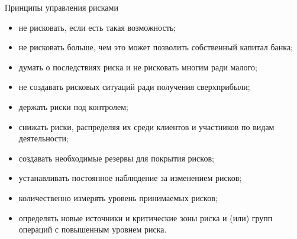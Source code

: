 \documentclass[financial_risks_lectures.tex]{subfiles}
\begin{document}
\begin{frame}[ allowframebreaks ]{Принципы управления рисками}
\begin{itemize}
\item
не рисковать, если есть такая возможность;
\item
не рисковать больше, чем это может позволить собственный капитал банка;
\item
думать о последствиях риска и не рисковать многим ради малого;
\item
не создавать рисковых ситуаций ради получения сверхприбыли;
\item
держать риски под контролем;
\item
снижать риски, распределяя их среди клиентов и участников по видам деятельности;
\pagebreak
\item
создавать необходимые резервы для покрытия рисков;
\item
устанавливать постоянное наблюдение за изменением рисков;
\item
количественно измерять уровень принимаемых рисков;
\item
определять новые источники и критические зоны риска и (или) групп операций с повышенным уровнем риска.
\end{itemize}
\end{frame}
\end{document}
